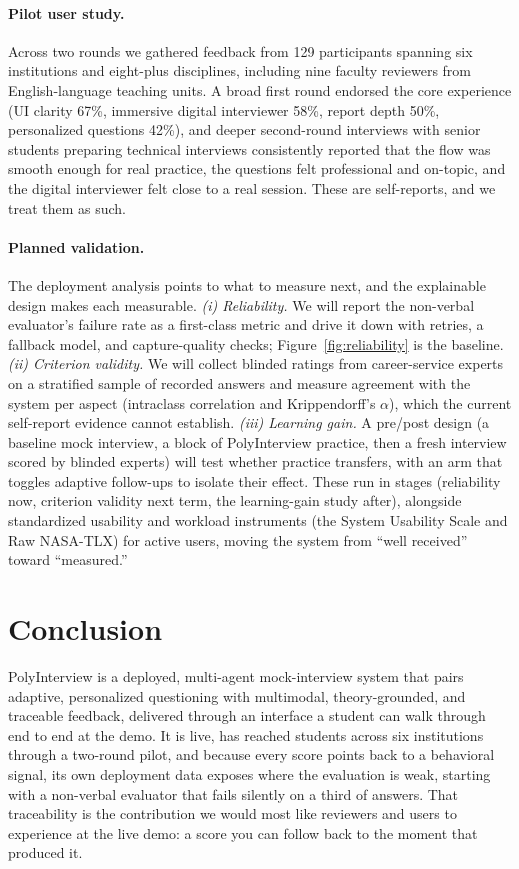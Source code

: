 \documentclass[11pt]{article}
\begin{document}
\paragraph{Pilot user study.} Across two rounds we gathered feedback from 129 participants spanning six institutions and eight-plus disciplines, including nine faculty reviewers from English-language teaching units. A broad first round endorsed the core experience (UI clarity 67\%, immersive digital interviewer 58\%, report depth 50\%, personalized questions 42\%), and deeper second-round interviews with senior students preparing technical interviews consistently reported that the flow was smooth enough for real practice, the questions felt professional and on-topic, and the digital interviewer felt close to a real session. These are self-reports, and we treat them as such.

\paragraph{Planned validation.} The deployment analysis points to what to measure next, and the explainable design makes each measurable. \emph{(i) Reliability.} We will report the non-verbal evaluator's failure rate as a first-class metric and drive it down with retries, a fallback model, and capture-quality checks; Figure~\ref{fig:reliability} is the baseline. \emph{(ii) Criterion validity.} We will collect blinded ratings from career-service experts on a stratified sample of recorded answers and measure agreement with the system per aspect (intraclass correlation and Krippendorff's $\alpha$), which the current self-report evidence cannot establish. \emph{(iii) Learning gain.} A pre/post design (a baseline mock interview, a block of PolyInterview practice, then a fresh interview scored by blinded experts) will test whether practice transfers, with an arm that toggles adaptive follow-ups to isolate their effect. These run in stages (reliability now, criterion validity next term, the learning-gain study after), alongside standardized usability and workload instruments (the System Usability Scale and Raw NASA-TLX) for active users, moving the system from ``well received'' toward ``measured.''

\section{Conclusion}
PolyInterview is a deployed, multi-agent mock-interview system that pairs adaptive, personalized questioning with multimodal, theory-grounded, and traceable feedback, delivered through an interface a student can walk through end to end at the demo. It is live, has reached students across six institutions through a two-round pilot, and because every score points back to a behavioral signal, its own deployment data exposes where the evaluation is weak, starting with a non-verbal evaluator that fails silently on a third of answers. That traceability is the contribution we would most like reviewers and users to experience at the live demo: a score you can follow back to the moment that produced it.
\end{document}
